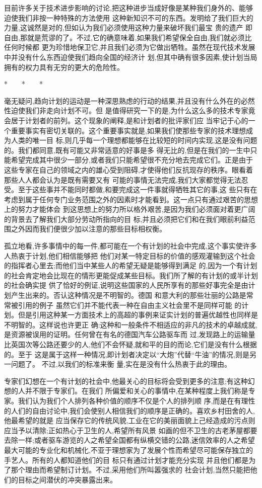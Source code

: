 ﻿\documentclass[12pt]{article}
\begin{document}
目前许多关于技术进步影响的讨论,把这种进步当成好像是某种我们身外的、能够迫使我们非按一种特殊的方法使用
这种新知识不可的东西。发明给了我们巨大的力量,这诚然是对的,但如认为我们必须使用这种力量来破坏我们最宝
贵的遗产 \myrule 即自由,那就是荒谬的了。不过,它的确意味着,如果我们希望保全自由,我们就必须比任何时候都
更为珍惜地保卫它,并且我们必须为它做出牺牲。虽然在现代技术发展中并没有什么东西迫使我们趋向全国的经济计
划,但其中确有很多因素,使计划当局拥有的权力具有无穷的更大的危险性。

*　　*　　*

毫无疑问,趋向计划的运动是一种深思熟虑的行动的结果,并且没有什么外在的必然性迫使我们非走向计划不可。但
是值得研究一下的是,为什么这么多的技术专家竟会居于计划者的前列。这个现象的阐释,是和计划者的批评家们应
当牢记于心的一个重要事实有密切关联的。这个重要事实就是,如果我们使那些专家的技术理想成为人类的唯一目
标,则几乎每一个理想都能够在比较短的时间内实现,这是没有问题的。我们都同意,既有可能又非常适意的好事是多
得无比的,但是在我们的一生中只能希望完成其中很少一部分,或者我们只能希望很不充分地去完成它们。正是由于
这些专家在自己的领域之内的雄心受到阻碍,才使得他们反抗现存的秩序。眼看着那些人人都会认为是既有需要又有
可能的事情无法完成,我们大家都觉得无法忍受。至于这些事并不能同时都做,和要完成这一件事就得牺牲其它的事,这
些只有在考虑到属于任何专门业务范围之外的因素时才能看到。这一点只有通过艰苦的思想上的努力才能体会
到\myrule 这思想上的努力所以格外艰苦,是因为我们必须面对着更广阔的背景去了解我们大部分劳动所指向的目
标,并且必须把它们和在我们眼前利益范围之外因而我们便很少加以注意的那些目标相权衡。

孤立地看,许多事情中的每一件,都可能在一个有计划的社会中完成,这个事实使许多人热衷于计划,他们相信能够把
他们对某一特定目标的价值的感观灌输到这个社会的指挥者心里去;而他们当中某些人的希望无疑是能够得到满足
的,因为一个有计划的社会肯定地会比现在的情形更能促成某些目标。我们所了解的有计划的或半计划的社会确实提
供了恰好的例证,说明这些国家的人民所享有的那些好事完全是由计划产生出来的。否认这种情况是不明智的。德国
和意大利的那些壮丽的公路是常常被引用的例子 \myrule 虽然它们并不能代表一种在自由主义社会里不是同样可能
的计划。但是引用这种某一方面技术上的高超的事例来证实计划的普遍优越性也同样是不明智的。这样说也许更正
确:这种和一般条件不相适应的非凡的技术的卓越成就,是资源被误用的证明。任何曾在有名的德国汽车公路驱车而
过,发现路上的运输量比英国次等公路还要少的人,他们不会怀疑,就和平的目的而论,它们是没有什么根据的。至于
这是属于这样一种情况,即计划者决定以``大炮''代替``牛油''的情况,则是另一问题了。 不过,以我们的标准来衡
量,实在是没有什么热衷于此的理由。

专家们幻想在一个有计划的社会中,他最关心的目标将会受到更多的注意;有这种幻想的人并不限于专家们。在我们
所偏爱和关心的事情中,在某种程度上我们称是专家。我们认为我们个人排列各种价值的顺序不仅是个人的排列顺
序,而是在有理性的人们的自由讨论中,我们会使别人相信我们的顺序是正确的。喜欢乡村田舍的人,他最希望的就是
应当保存它的传统风貌,工业在它的美丽面貌上己经造成的污点则应当予以清除;正如热心于卫生的人,希望所有风景
如画的但不卫生的古老茅屋都要去除一样;或者驱车游览的人之希望全国都有纵横交错的公路,迷信效率的人之希望
最大可能的专业化和机械化,不亚于理想家为了发展个性而希望尽可能保存独立的手艺人。所有的人都知道他们的目
标只有通过计划才能充分实现 \myrule 并且他们都是为了那个理由而希望制订计划。不过,采用他们所叫嚣强求的
社会计划,当然只能把他们的目标之间潜伏的冲突暴露出来。
\end{document}
